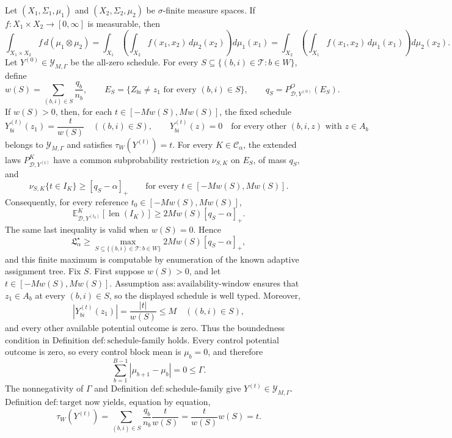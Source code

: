 Let \((X_1,\Sigma_1,\mu_1)\) and \((X_2,\Sigma_2,\mu_2)\) be \(\sigma\)-finite measure spaces.  If \(f:X_1\times X_2\to[0,\infty]\) is measurable, then
\[
 \int_{X_1\times X_2} f\,d(\mu_1\otimes\mu_2)
 =\int_{X_1}\!\left(\int_{X_2}f(x_1,x_2)\,d\mu_2(x_2)\right)d\mu_1(x_1)
 =\int_{X_2}\!\left(\int_{X_1}f(x_1,x_2)\,d\mu_1(x_1)\right)d\mu_2(x_2).
\]
Let \(Y^{(0)}\in\mathcal Y_{M,\Gamma}\) be the all-zero schedule.  For every
\(S\subseteq\{(b,i)\in\mathcal T:b\in W\}\), define
\[
 w(S)=\sum_{(b,i)\in S}\frac{q_b}{n_b},
 \qquad
 E_S=\{Z_{bi}\ne z_1\text{ for every }(b,i)\in S\},
 \qquad
 q_S=P^O_{\mathcal D,Y^{(0)}}(E_S).
\]
If \(w(S)>0\), then, for each \(t\in[-Mw(S),Mw(S)]\), the fixed schedule
\[
 Y^{(t)}_{bi}(z_1)=\frac{t}{w(S)}\quad ((b,i)\in S),
 \qquad
 Y^{(t)}_{bi}(z)=0\quad\text{for every other }(b,i,z)\text{ with }z\in A_b
\]
belongs to \(\mathcal Y_{M,\Gamma}\) and satisfies \(\tau_W(Y^{(t)})=t\).  For every \(K\in\mathcal C_\alpha\), the extended laws \(P^K_{\mathcal D,Y^{(t)}}\) have a common subprobability restriction \(\nu_{S,K}\) on \(E_S\), of mass \(q_S\), and
\[
 \nu_{S,K}\{t\in I_K\}\ge[q_S-\alpha]_+
 \qquad\text{for every }t\in[-Mw(S),Mw(S)].
\]
Consequently, for every reference \(t_0\in[-Mw(S),Mw(S)]\),
\[
 \mathbb E^K_{\mathcal D,Y^{(t_0)}}[\operatorname{len}(I_K)]
 \ge 2Mw(S)[q_S-\alpha]_+.
\]
The same last inequality is valid when \(w(S)=0\).  Hence
\[
 \mathfrak L_\alpha^\star
 \ge
 \max_{S\subseteq\{(b,i)\in\mathcal T:b\in W\}}
 2Mw(S)[q_S-\alpha]_+,
\]
and this finite maximum is computable by enumeration of the known adaptive assignment tree.
Fix \(S\).  First suppose \(w(S)>0\), and let \(t\in[-Mw(S),Mw(S)]\).  Assumption \(\mathrm{ass:availability\text{-}window}\) ensures that \(z_1\in A_b\) at every \((b,i)\in S\), so the displayed schedule is well typed.  Moreover,
\[
 \left|Y^{(t)}_{bi}(z_1)\right|=\frac{|t|}{w(S)}\le M
 \quad ((b,i)\in S),
\]
and every other available potential outcome is zero.  Thus the boundedness condition in Definition \(\mathrm{def:schedule\text{-}family}\) holds.  Every control potential outcome is zero, so every control block mean is \(\mu_b=0\), and therefore
\[
 \sum_{b=1}^{B-1}|\mu_{b+1}-\mu_b|=0\le\Gamma.
\]
The nonnegativity of \(\Gamma\) and Definition \(\mathrm{def:schedule\text{-}family}\) give \(Y^{(t)}\in\mathcal Y_{M,\Gamma}\).  Definition \(\mathrm{def:target}\) now yields, equation by equation,
\[
 \tau_W(Y^{(t)})
 =\sum_{(b,i)\in S}\frac{q_b}{n_b}\frac{t}{w(S)}
 =\frac{t}{w(S)}w(S)
 =t.
\]

